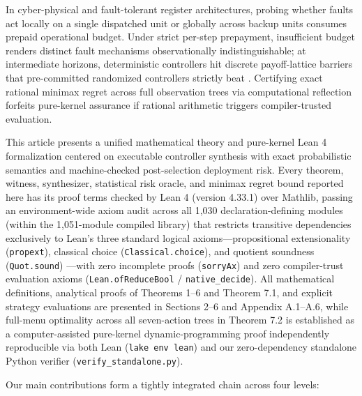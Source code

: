 \documentclass[11pt,a4paper]{article}
\begin{document}
\begin{enumerate}
  In cyber-physical and fault-tolerant register architectures, probing
  whether faults act locally on a single dispatched unit or globally
  across backup units consumes prepaid operational budget. Under strict
  per-step prepayment, insufficient budget renders distinct fault
  mechanisms observationally indistinguishable; at intermediate
  horizons, deterministic controllers hit discrete payoff-lattice
  barriers that pre-committed randomized controllers strictly beat
  \citep{vonNeumann1928, wald1950, savage1951}. Certifying exact
  rational minimax regret across full observation trees via
  computational reflection \citep{boutin1997, gregoireMahboubi2005}
  forfeits pure-kernel assurance if rational arithmetic triggers
  compiler-trusted evaluation.
\end{enumerate}

This article presents a unified mathematical theory and pure-kernel Lean
4 formalization \citep{mouraUllrich2021, mathlib2020} centered on
executable controller synthesis with exact probabilistic semantics and
machine-checked post-selection deployment risk. Every theorem, witness,
synthesizer, statistical risk oracle, and minimax regret bound reported
here has its proof terms checked by Lean 4 (version 4.33.1) over
Mathlib, passing an environment-wide axiom audit across all 1,030
declaration-defining modules (within the 1,051-module compiled library)
that restricts transitive dependencies exclusively to Lean's three
standard logical axioms---propositional extensionality
(\texttt{propext}), classical choice (\texttt{Classical.choice}), and
quotient soundness (\texttt{Quot.sound}) \citep{carneiro2019}---with
zero incomplete proofs (\texttt{sorryAx}) and zero compiler-trust
evaluation axioms (\texttt{Lean.ofReduceBool} /
\texttt{native\_decide}). All mathematical definitions, analytical
proofs of Theorems 1--6 and Theorem 7.1, and explicit strategy
evaluations are presented in Sections 2--6 and Appendix A.1--A.6, while
full-menu optimality across all seven-action trees in Theorem 7.2 is
established as a computer-assisted pure-kernel dynamic-programming proof
independently reproducible via both Lean (\texttt{lake\ env\ lean}) and
our zero-dependency standalone Python verifier
(\texttt{verify\_standalone.py}).

Our main contributions form a tightly integrated chain across four
levels:
\end{document}
